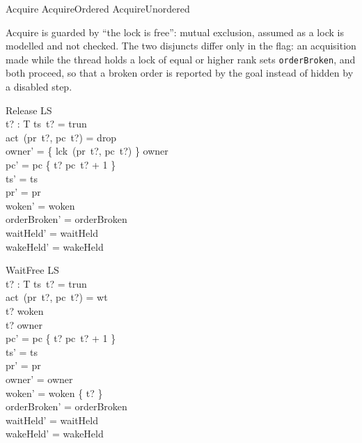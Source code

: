 \documentclass[a4paper,10pt,fleqn]{article}
\begin{document}
\begin{zed}
  Acquire  AcquireOrdered \lor AcquireUnordered
\end{zed}

Acquire is guarded by ``the lock is free'': mutual exclusion, assumed as a
lock is modelled and not checked.  The two disjuncts differ only in the flag:
an acquisition made while the thread holds a lock of equal or higher rank
sets \texttt{orderBroken}, and both proceed, so that a broken order is
reported by the goal instead of hidden by a disabled step.

\begin{schema}{Release}
  \Delta LS \\
  t? : T
\where
  ts~t? = trun \\
  act~(pr~t?, pc~t?) = drop \\
  owner' = \{ lck~(pr~t?, pc~t?) \} \ndres owner \\
  pc' = pc \oplus \{ t? \mapsto pc~t? + 1 \} \\
  ts' = ts \\
  pr' = pr \\
  woken' = woken \\
  orderBroken' = orderBroken \\
  waitHeld' = waitHeld \\
  wakeHeld' = wakeHeld
\end{schema}

\begin{schema}{WaitFree}
  \Delta LS \\
  t? : T
\where
  ts~t? = trun \\
  act~(pr~t?, pc~t?) = wt \\
  t? \in woken \\
  t? \notin \ran owner \\
  pc' = pc \oplus \{ t? \mapsto pc~t? + 1 \} \\
  ts' = ts \\
  pr' = pr \\
  owner' = owner \\
  woken' = woken \setminus \{ t? \} \\
  orderBroken' = orderBroken \\
  waitHeld' = waitHeld \\
  wakeHeld' = wakeHeld
\end{schema}
\end{document}
